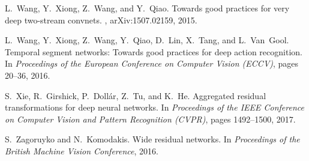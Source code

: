 \documentclass[10pt,twocolumn,letterpaper]{article}
\begin{document}
{\begin{thebibliography}{10}
  L.~Wang, Y.~Xiong, Z.~Wang, and Y.~Qiao.
  \newblock Towards good practices for very deep two-stream convnets.
  , arXiv:1507.02159, 2015.
  
  L.~Wang, Y.~Xiong, Z.~Wang, Y.~Qiao, D.~Lin, X.~Tang, and L.~Van~Gool.
  \newblock Temporal segment networks: Towards good practices for deep action
    recognition.
  \newblock In {\em Proceedings of the European Conference on Computer Vision
    (ECCV)}, pages 20--36, 2016.
  
  S.~Xie, R.~Girshick, P.~Doll\'{a}r, Z.~Tu, and K.~He.
  \newblock Aggregated residual transformations for deep neural networks.
  \newblock In {\em Proceedings of the IEEE Conference on Computer Vision and
    Pattern Recognition (CVPR)}, pages 1492--1500, 2017.
  
  S.~Zagoruyko and N.~Komodakis.
  \newblock Wide residual networks.
  \newblock In {\em Proceedings of the British Machine Vision Conference}, 2016.
  
  \end{thebibliography}  
}
\end{document}
